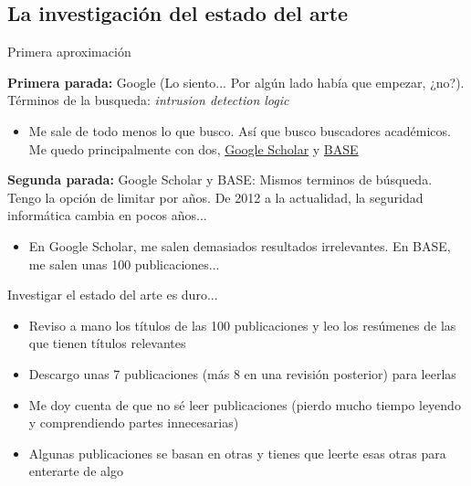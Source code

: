 \documentclass{beamer}
\newcommand{\hrefCustom}[2]{\href{#1}{\color{blue} #2}}
\begin{document}
\subsection{La investigación del estado del arte}

\begin{frame}{Primera aproximación}

\textbf{Primera parada:} Google (Lo siento... Por algún lado había que empezar, ¿no?). Términos de la busqueda: \emph{intrusion detection logic}

\begin{itemize}
	\item Me sale de todo menos lo que busco. Así que busco buscadores académicos. Me quedo principalmente con dos, \hrefCustom{http://scholar.google.com}{Google Scholar} y \hrefCustom{http://www.base-search.net}{BASE}
\end{itemize}

\textbf{Segunda parada:} Google Scholar y BASE: Mismos terminos de búsqueda. Tengo la opción de limitar por años. De 2012 a la actualidad, la seguridad informática cambia en pocos años...

\begin{itemize}
	\item En Google Scholar, me salen demasiados resultados irrelevantes. En BASE, me salen unas 100 publicaciones...
\end{itemize}

\end{frame}

\begin{frame}{Investigar el estado del arte es duro...}

\begin{itemize}
	\item Reviso a mano los títulos de las 100 publicaciones y leo los resúmenes de las que tienen títulos relevantes
\end{itemize}
\begin{itemize}
	\item Descargo unas 7 publicaciones (más 8 en una revisión posterior) para leerlas
\end{itemize}
\begin{itemize}
	\item Me doy cuenta de que no sé leer publicaciones (pierdo mucho tiempo leyendo y comprendiendo partes innecesarias)
\end{itemize}
\begin{itemize}
	\item Algunas publicaciones se basan en otras y tienes que leerte esas otras para enterarte de algo
\end{itemize}

\end{frame}
\end{document}

